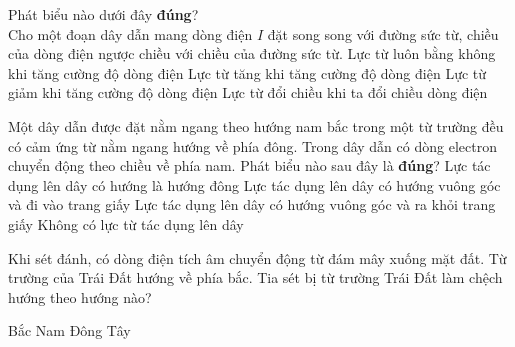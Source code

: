 \begin{ex}
	Phát biểu nào dưới đây \textbf{đúng}?\\
	Cho một đoạn dây dẫn mang dòng điện $I$ đặt song song với đường sức từ, chiều của dòng điện ngược chiều với chiều của đường sức từ.
	\choice
	{\True Lực từ luôn bằng không khi tăng cường độ dòng điện}
	{Lực từ tăng khi tăng cường độ dòng điện}
	{Lực từ giảm khi tăng cường độ dòng điện}
	{Lực từ đổi chiều khi ta đổi chiều dòng điện}
	\loigiai{}
\end{ex}
\begin{ex}
	Một dây dẫn được đặt nằm ngang theo hướng nam bắc trong một từ trường đều có cảm ứng từ nằm ngang hướng về phía đông. Trong dây dẫn có dòng electron chuyển động theo chiều về phía nam. Phát biểu nào sau đây là \textbf{đúng}?
	\choice
	{Lực tác dụng lên dây có hướng là hướng đông}
	{\True Lực tác dụng lên dây có hướng vuông góc và đi vào trang giấy}
	{Lực tác dụng lên dây có hướng vuông góc và ra khỏi trang giấy}
	{Không có lực từ tác dụng lên dây}
	\loigiai{}
\end{ex}
\begin{ex}
	Khi sét đánh, có dòng điện tích âm chuyển động từ đám mây xuống mặt đất. Từ trường của Trái Đất hướng về phía bắc. Tia sét bị từ trường Trái Đất làm chệch hướng theo hướng nào?
	
	\choice
	{Bắc}
	{Nam}
	{Đông}
	{\True Tây}
\end{ex}

